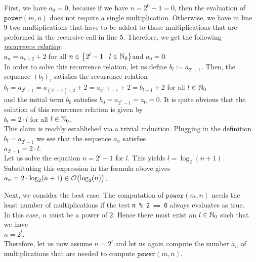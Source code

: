 First, we have $a_0 = 0$, because if we have $n = 2^0 - 1 = 0$, then the evaluation of 
$\mathtt{power}(m, n)$ does not require a single multiplication.
Otherwise, we have in line 9 two multiplications that have to be added to those multiplications
that are performed in the recursive call in line 5.  Therefore, we get the following
\href{http://en.wikipedia.org/wiki/Recurrence_relation}{\emph{recurrence relation}}:
\\[0.2cm]
\hspace*{1.3cm}
$a_n = a_{n \backslash 2} + 2$ \qquad for all $n \in \left\{2^l - 1 \mid l \in {\mathbb N}_0\right\}$\quad and $a_0 = 0$. 
\\[0.2cm]
In order to solve this recurrence relation, let us define $b_l := a_{2^l-1}$.  Then, the sequence
$(b_l)_l$ 
satisfies the recurrence relation
 \\[0.2cm]
\hspace*{1.3cm} 
$b_l = a_{2^l-1} = a_{(2^l-1) \backslash 2} + 2 = a_{2^{l-1}-1} + 2 = b_{l-1} +2$ \qquad for all $l\in{\mathbb N}_0$
\\[0.2cm]
and the initial term $b_0$ satisfies $b_0 = a_{2^0-1} = a_0 = 0$.  It is quite obvious that the
solution of this recurrence relation is given by
\\[0.2cm]
\hspace*{1.3cm} $b_l = 2 \cdot l$ \qquad for all $l \in {\mathbb N}_0$. 
\\[0.2cm] 
This claim is readily established via a trivial induction.  Plugging in the definition $b_l = a_{2^l-1}$ we
see that the sequence $a_n$ satisfies \\[0.2cm]
\hspace*{1.3cm} $a_{2^l-1} = 2 \cdot l$. 
\\[0.2cm]
Let us solve the equation $n = 2^l - 1$ for $l$.  This yields
 $l =
\log_2(n+1)$.  Substituting this expression in the formula above gives \\[0.2cm]
\hspace*{1.3cm} $a_n = 2 \cdot \log_2(n+1) \in \mathcal{O}\bigl(\log_2(n)\bigr)$.
\vspace*{0.3cm}

Next, we consider the best case.  The computation of
$\mathtt{power}(m,n)$ needs the least number of multiplications if the test 
\texttt{n \% 2 == 0} always evaluates as true.  In this case, $n$ must be a power of $2$.  
Hence there must exist an $l\in {\mathbb N}_0$ such that we have
 \\[0.2cm]
\hspace*{1.3cm} $n = 2^l$.
 \\[0.2cm]
Therefore, let us now assume $n = 2^l$ and let us again compute the number $a_n$ of multiplications
that are needed to compute $\mathtt{power}(m,n)$. 

